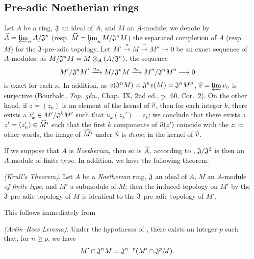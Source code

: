 \subsection{Pre-adic Noetherian rings}
\label{subsection-pre-adic-noetherian-rings}

\begin{env}[7.3.1]
\label{0.7.3.1}
Let $A$ be a ring, $\mathfrak{J}$ an ideal of $A$, and $M$ an $A$-module; we denote by
$\widehat{A}=\varprojlim_n A/\mathfrak{J}^n$
(resp. $\widehat{M}=\varprojlim_n M/\mathfrak{J}^n M$) the separated completion of $A$
(resp. $M$) for the $\mathfrak{J}$-pre-adic topology. Let
$M'\xrightarrow{u}M\xrightarrow{v}M''\to 0$ be an exact sequence of $A$-modules; as
$M/\mathfrak{J}^n M=M\otimes_A(A/\mathfrak{J}^n)$, the sequence
\[
  M'/\mathfrak{J}^n M'\xrightarrow{u_n}M/\mathfrak{J}^n M
  \xrightarrow{v_n}M''/\mathfrak{J}^n M''\longrightarrow 0
\]
is exact for each $n$. In addition, as
$v(\mathfrak{J}^n M)=\mathfrak{J}^n v(M)=\mathfrak{J}^n M''$,
$\widehat{v}=\varprojlim v_n$ is surjective (Bourbaki, \emph{Top. g\'en.}, Chap.~IX,
2nd ed., p.~60, Cor.~2). On the other hand, if $z=(z_k)$ is an element of the kernel of
$\widehat{v}$, then for each integer $k$, there exists a $z_k'\in M'/\mathfrak{J}^k M'$
such that $u_k(z_k')=z_k$; we conclude that there exists  a $z'=(z_n')\in\widehat{M'}$
such that the first $k$ components of $\widehat{u}(z')$ coincide with the $z$; in other
words, the image of $\widehat{M'}$ under $\widehat{u}$ is \emph{dense} in the kernel of
$\widehat{v}$.

If we suppose that $A$ is \emph{Noetherian}, then so is $\widehat{A}$, according to
, $\mathfrak{J}/\mathfrak{J}^2$ is then an $A$-module of
finite type. In addition, we have the following theorem.
\end{env}

\begin{thm}[7.3.2]
\label{0.7.3.2}
\emph{(Krull's Theorem)}. Let $A$ be a \emph{Noetherian} ring, $\mathfrak{J}$ an ideal of
$A$, $M$ an $A$-module \emph{of finite type}, and $M'$ a submodule of $M$; then the induced
topology on $M'$ by the $\mathfrak{J}$-pre-adic topology of $M$ is identical to the
$\mathfrak{J}$-pre-adic topology of $M'$.
\end{thm}

This follows immediately from
\begin{lem}[7.3.2.1]
\label{0.7.3.2.1}
\emph{(Artin--Rees Lemma)}. Under the hypotheses of , there
exists an integer $p$ such that, for $n\geqslant p$, we have
\[
  M'\cap\mathfrak{J}^n M=\mathfrak{J}^{n-p}(M'\cap\mathfrak{J}^p M).
\]
\end{lem}

